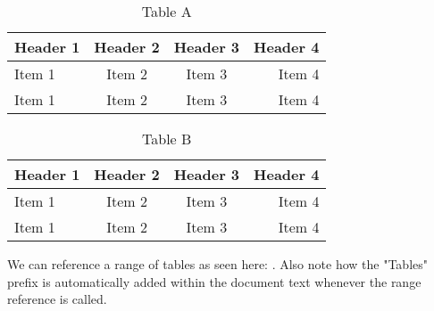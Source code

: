 \begin{table}[H]
   \caption{Table A} 
   \label{tab:tab-a}
   \small
   \centering
   \begin{tabular}{lccr}
   \toprule\toprule
   \textbf{Header 1} & \textbf{Header 2} & \textbf{Header 3} & \textbf{Header 4} \\ 
   \midrule
   Item 1 & Item 2 & Item 3 & Item 4 \\
   Item 1 & Item 2 & Item 3 & Item 4\\
   \bottomrule
   \end{tabular}
\end{table}

\begin{table}[H]
   \caption{Table B} 
   \label{tab:tab-b}
   \small
   \centering
   \begin{tabular}{lccr}
   \toprule\toprule
   \textbf{Header 1} & \textbf{Header 2} & \textbf{Header 3} & \textbf{Header 4} \\ 
   \midrule
   Item 1 & Item 2 & Item 3 & Item 4 \\
   Item 1 & Item 2 & Item 3 & Item 4\\
   \bottomrule
   \end{tabular}
\end{table}

We can reference a range of tables as seen here: .
Also note how the "Tables" prefix is automatically added within the document text whenever the range reference is called.